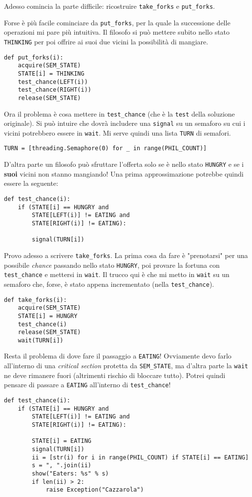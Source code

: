 \documentclass{article}
\begin{document}
Adesso comincia la parte difficile: ricostruire \texttt{take\_forks} e
\texttt{put\_forks}.

Forse è più facile cominciare da \texttt{put\_forks}, per la quale la
successione delle operazioni mi pare più intuitiva.  Il filosofo si
può mettere subito nello stato \texttt{THINKING} per poi offrire ai suoi
due vicini la possibilità di mangiare.
\begin{verbatim}
def put_forks(i):
    acquire(SEM_STATE)
    STATE[i] = THINKING
    test_chance(LEFT(i))
    test_chance(RIGHT(i))
    release(SEM_STATE)
\end{verbatim}

Ora il problema è cosa mettere in \texttt{test\_chance} (che è la \texttt{test}
della soluzione originale).  Si può intuire che dovrà includere una
\texttt{signal} su un semaforo su cui i vicini potrebbero essere in \texttt{wait}.
Mi serve quindi una lista \texttt{TURN} di semafori.  
\begin{verbatim}
TURN = [threading.Semaphore(0) for _ in range(PHIL_COUNT)]
\end{verbatim}

D'altra parte un filosofo può sfruttare l'offerta solo se è nello
stato \texttt{HUNGRY} e se i \textbf{suoi} vicini non stanno mangiando!  Una prima
approssimazione potrebbe quindi essere la seguente:
\begin{verbatim}
def test_chance(i):
    if (STATE[i] == HUNGRY and
        STATE[LEFT(i)] != EATING and
        STATE[RIGHT(i)] != EATING):

        signal(TURN[i])
\end{verbatim}

Provo adesso a scrivere \texttt{take\_forks}.  La prima cosa da fare è
"prenotarsi" per una possibile \emph{chance} passando nello stato
\texttt{HUNGRY}, poi provare la fortuna con \texttt{test\_chance} e mettersi in
\texttt{wait}.  Il trucco qui è che mi metto in \texttt{wait} su un semaforo che,
forse, è stato appena incrementato (nella \texttt{test\_chance}).
\begin{verbatim}
def take_forks(i):
    acquire(SEM_STATE)
    STATE[i] = HUNGRY
    test_chance(i)
    release(SEM_STATE)
    wait(TURN[i])
\end{verbatim}

Resta il problema di dove fare il passaggio a \texttt{EATING}!  Ovviamente
devo farlo all'interno di una \emph{critical section} protetta da
\texttt{SEM\_STATE}, ma d'altra parte la \texttt{wait} ne deve rimanere fuori
(altrimenti rischio di bloccare tutto).  Potrei quindi pensare di
passare a \texttt{EATING} all'interno di \texttt{test\_chance}!
\begin{verbatim}
def test_chance(i):
    if (STATE[i] == HUNGRY and
        STATE[LEFT(i)] != EATING and
        STATE[RIGHT(i)] != EATING):

        STATE[i] = EATING
        signal(TURN[i])
        ii = [str(i) for i in range(PHIL_COUNT) if STATE[i] == EATING]
        s = ", ".join(ii)
        show("Eaters: %s" % s)
        if len(ii) > 2:         
            raise Exception("Cazzarola")
\end{verbatim}
\end{document}
